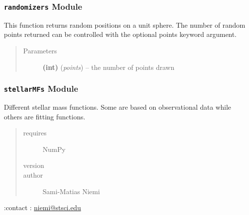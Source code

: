 \documentclass[letterpaper,10pt,english]{sphinxmanual}
\begin{document}
\subsubsection{\texttt{randomizers} Module}
\label{SamPy.astronomy:module-SamPy.astronomy.randomizers}\label{SamPy.astronomy:randomizers-module}

\begin{fulllineitems}
\label{SamPy.astronomy:SamPy.astronomy.randomizers.randomUnitSphere}
This function returns random positions
on a unit sphere. The number of random
points returned can be controlled with
the optional points keyword argument.
\begin{quote}\begin{description}
\item[{Parameters}] \leavevmode
\textbf{(int)} (\emph{points}) -- the number of points drawn

\end{description}\end{quote}

\end{fulllineitems}



\subsubsection{\texttt{stellarMFs} Module}
\label{SamPy.astronomy:module-SamPy.astronomy.stellarMFs}\label{SamPy.astronomy:stellarmfs-module}
Different stellar mass functions. Some are based on
observational data while others are fitting functions.
\begin{quote}\begin{description}
\item[{requires}] \leavevmode
NumPy

\item[{version}] 

\item[{author}] \leavevmode
Sami-Matias Niemi

\end{description}\end{quote}

:contact : \href{mailto:niemi@stsci.edu}{niemi@stsci.edu}
\end{document}
